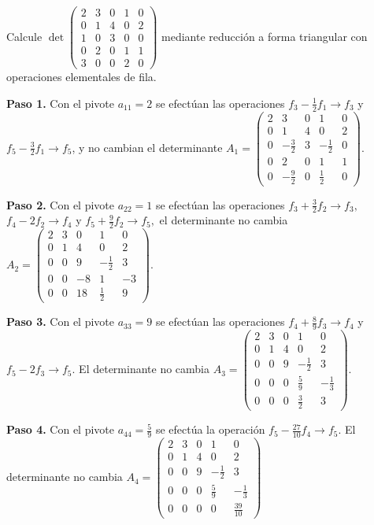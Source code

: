 \begin{example}
Calcule \(\det \begin{pmatrix} 2 & 3 & 0 & 1 & 0 \\ 0 & 1 & 4 & 0 & 2 \\ 1 & 0 & 3 & 0 & 0 \\ 0 & 2 & 0 & 1 & 1 \\ 3 & 0 & 0 & 2 & 0 \end{pmatrix}\) mediante reducción a forma triangular con operaciones elementales de fila.

\begin{myproof} \textbf{Paso 1.} Con el pivote \(a_{11} = 2\) se efectúan las operaciones \(f_3 - \frac{1}{2}f_1 \to f_3\)  y  \( f_5 - \frac{3}{2}f_1\to f_5\), y no cambian el determinante
\(
A_1 = \begin{pmatrix}
2 & 3 & 0 & 1 & 0 \\
0 & 1 & 4 & 0 & 2 \\
0 & -\frac{3}{2} & 3 & -\frac{1}{2} & 0 \\
0 & 2 & 0 & 1 & 1 \\
0 & -\frac{9}{2} & 0 & \frac{1}{2} & 0
\end{pmatrix}.\)

\textbf{Paso 2.} Con el pivote \(a_{22} = 1\) se efectúan las operaciones \(f_3 + \frac{3}{2}f_2 \to f_3,\) \(f_4 - 2f_2\to f_4\) y \(f_5 + \frac{9}{2}f_2 \to f_5,\) el determinante no cambia \(
A_2 = \begin{pmatrix}
2 & 3 & 0 & 1 & 0 \\
0 & 1 & 4 & 0 & 2 \\
0 & 0 & 9 & -\frac{1}{2} & 3 \\
0 & 0 & -8 & 1 & -3 \\
0 & 0 & 18 & \frac{1}{2} & 9
\end{pmatrix}.\)

\textbf{Paso 3.} Con el pivote \(a_{33} = 9\) se efectúan las operaciones \(f_4 + \frac{8}{9}f_3 \to f_4\) y \(f_5 - 2f_3\to f_5.\) El determinante no cambia \(
A_3 = \begin{pmatrix}
2 & 3 & 0 & 1 & 0 \\
0 & 1 & 4 & 0 & 2 \\
0 & 0 & 9 & -\frac{1}{2} & 3 \\
0 & 0 & 0 & \frac{5}{9} & -\frac{1}{3} \\
0 & 0 & 0 & \frac{3}{2} & 3
\end{pmatrix}.\)

\textbf{Paso 4.} Con el pivote \(a_{44} = \frac{5}{9}\) se efectúa la operación \(f_5 - \frac{27}{10}f_4 \to f_5.\) El determinante no cambia \(
A_4 = \begin{pmatrix}
2 & 3 & 0 & 1 & 0 \\
0 & 1 & 4 & 0 & 2 \\
0 & 0 & 9 & -\frac{1}{2} & 3 \\
0 & 0 & 0 & \frac{5}{9} & -\frac{1}{3} \\
0 & 0 & 0 & 0 & \frac{39}{10}
\end{pmatrix}\)


\end{myproof}
\end{example}
